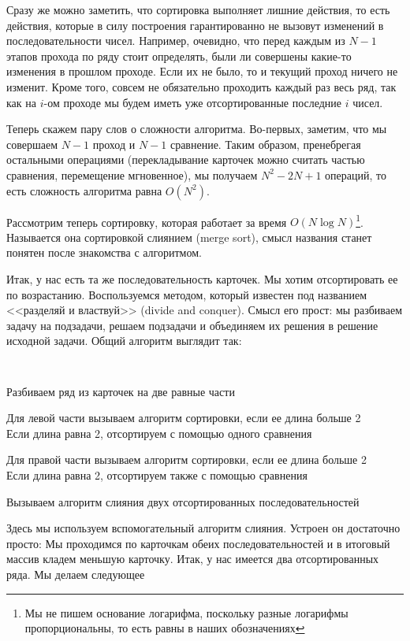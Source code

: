 Сразу же можно заметить, что сортировка выполняет лишние действия, то есть действия,
которые в силу построения гарантированно не вызовут изменений в последовательности
чисел. Например, очевидно, что перед каждым из $N-1$ этапов прохода по ряду стоит
определять, были ли совершены какие-то изменения в прошлом проходе. Если их не было,
то и текущий проход ничего не изменит. Кроме того, совсем не обязательно проходить 
каждый раз весь ряд, так как на $i$-ом проходе мы будем иметь уже отсортированные
последние $i$ чисел.

Теперь скажем пару слов о сложности алгоритма. Во-первых, заметим, что мы совершаем 
$N-1$ проход и $N-1$ сравнение. Таким образом, пренебрегая остальными операциями 
(перекладывание карточек можно считать частью сравнения, перемещение мгновенное),
мы получаем $N^2 - 2N + 1$ операций, то есть сложность алгоритма равна $O(N^2)$.

Рассмотрим теперь сортировку, которая работает за время $O(N \log N)$\footnote{
Мы не пишем основание логарифма, поскольку разные логарифмы пропорциональны, то
есть равны в наших обозначениях}. Называется она сортировкой слиянием (merge sort),
смысл названия станет понятен после знакомства с алгоритмом.

Итак, у нас есть та же последовательность карточек. Мы хотим отсортировать ее по
возрастанию. Воспользуемся методом, который известен под названием <<разделяй и
властвуй>> (divide and conquer). Смысл его прост: мы разбиваем задачу на подзадачи,
решаем подзадачи и объединяем их решения в решение исходной задачи. Общий алгоритм
выглядит так:

\begin{enumerate}
    {\tt
    \item Разбиваем ряд из карточек на две равные части
    \item Для левой части вызываем алгоритм сортировки, если ее длина больше 2 \\
        Если длина равна 2, отсортируем с помощью одного сравнения
    \item Для правой части вызываем алгоритм сортировки, если ее длина больше 2 \\
        Если длина равна 2, отсортируем также с помощью сравнения
    \item Вызываем алгоритм слияния двух отсортированных последовательностей
    }
\end{enumerate}

Здесь мы используем вспомогательный алгоритм слияния. Устроен он достаточно просто:
Мы проходимся по карточкам обеих последовательностей и в итоговый массив кладем
меньшую карточку. Итак, у нас имеется два отсортированных ряда. Мы делаем следующее

